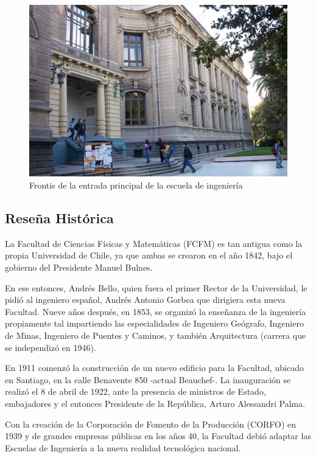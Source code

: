 \begin{figure}[ht!]
\centering
\includegraphics[width=\columnwidth]{./pictures/frontis.jpg}
\caption{Frontis de la entrada principal de la escuela de ingeniería}
\end{figure}

\subsection{Reseña Histórica}

La Facultad de Ciencias Físicas y Matemáticas (FCFM) es tan antigua como la propia Universidad
de Chile, ya que ambas se crearon en el año 1842, bajo el gobierno del Presidente Manuel Bulnes.

En ese entonces, Andrés Bello, quien fuera el primer Rector de la Universidad, le pidió al
ingeniero español, Andrés Antonio Gorbea que dirigiera esta nueva Facultad. Nueve años después,
en 1853, se organizó la enseñanza de la ingeniería propiamente tal impartiendo las especialidades de
Ingeniero Geógrafo, Ingeniero de Minas, Ingeniero de Puentes y Caminos, y también Arquitectura
(carrera que se independizó en 1946).

En 1911 comenzó la construcción de un nuevo edificio para la Facultad, ubicado en Santiago,
en la calle Benavente 850 -actual Beauchef-. La inauguración se realizó el 8 de abril de 1922, ante
la presencia de ministros de Estado, embajadores y el entonces Presidente de la República, Arturo
Alessandri Palma.

Con la creación de la Corporación de Fomento de la Producción (CORFO) en 1939 y de
grandes empresas públicas en los años 40, la Facultad debió adaptar las Escuelas de Ingeniería a la
nueva realidad tecnológica nacional.

